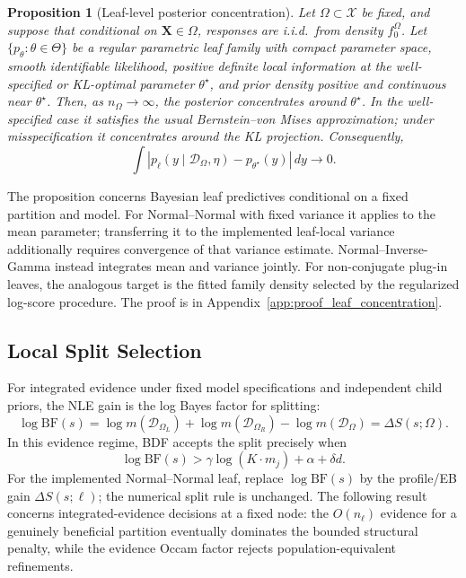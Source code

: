 \documentclass[10pt]{article} %
\newtheorem{proposition}[theorem]{Proposition}
\begin{document}
\begin{proposition}[Leaf-level posterior concentration]\label{prop:leaf_concentration}
Let $\Omega \subset \mathcal{X}$ be fixed, and suppose that conditional on $\mathbf{X}\in\Omega$, responses are i.i.d.\ from density $f_0^\Omega$. Let $\{p_\theta:\theta\in\Theta\}$ be a regular parametric leaf family with compact parameter space, smooth identifiable likelihood, positive definite local information at the well-specified or KL-optimal parameter $\theta^\star$, and prior density positive and continuous near $\theta^\star$. Then, as $n_\Omega\to\infty$, the posterior concentrates around $\theta^\star$. In the well-specified case it satisfies the usual Bernstein--von Mises approximation; under misspecification it concentrates around the KL projection. Consequently,
\begin{equation}\label{eq:ppd_convergence}
\int |p_\ell(y \mid \mathcal{D}_\Omega, \eta) - p_{\theta^\star}(y)|\,dy \to 0 .
\end{equation}
\end{proposition}

The proposition concerns Bayesian leaf predictives conditional on a fixed partition and model. For Normal--Normal with fixed variance it applies to the mean parameter; transferring it to the implemented leaf-local variance additionally requires convergence of that variance estimate. Normal--Inverse-Gamma instead integrates mean and variance jointly. For non-conjugate plug-in leaves, the analogous target is the fitted family density selected by the regularized log-score procedure. The proof is in Appendix~\ref{app:proof_leaf_concentration}.

\subsection{Local Split Selection}
\label{subsec:theory_tempered}
\label{subsec:theory_split_bf}

For integrated evidence under fixed model specifications and independent child priors, the NLE gain is the log Bayes factor for splitting:
\begin{equation}\label{eq:bf_local}
\log \mathrm{BF}(s)
=
\log m(\mathcal{D}_{\Omega_L})+\log m(\mathcal{D}_{\Omega_R})-\log m(\mathcal{D}_\Omega)
=
\Delta S(s;\Omega).
\end{equation}
In this evidence regime, BDF accepts the split precisely when
\begin{equation}\label{eq:bf_threshold}
\log \mathrm{BF}(s) >
\gamma\log(K \cdot m_j)+\alpha+\delta d .
\end{equation}
For the implemented Normal--Normal leaf, replace $\log\mathrm{BF}(s)$ by the profile/EB gain $\Delta S(s;\ell)$; the numerical split rule is unchanged. The following result concerns integrated-evidence decisions at a fixed node: the $O(n_\ell)$ evidence for a genuinely beneficial partition eventually dominates the bounded structural penalty, while the evidence Occam factor rejects population-equivalent refinements.
\end{document}

